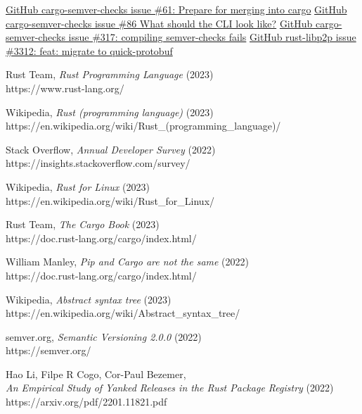 \documentclass[licencjacka,en]{pracamgr}
\begin{document}
\begin{thebibliography}{99}\label{r:chapter_bibliography}

 \href{}{GitHub cargo-semver-checks issue \#61: Prepare for merging into cargo}
 \href{}{GitHub cargo-semver-checks issue \#86 What should the CLI look like?}
 \href{}{GitHub cargo-semver-checks issue \#317: compiling semver-checks fails}
 \href{}{GitHub rust-libp2p issue \#3312: feat: migrate to quick-protobuf}

 Rust Team,
	\textit{Rust Programming Language} (2023) \\
	https://www.rust-lang.org/

 Wikipedia,
	\textit{Rust (programming language)} (2023) \\
	https://en.wikipedia.org/wiki/Rust\_(programming\_language)/

 Stack Overflow,
	\textit{Annual Developer Survey} (2022) \\
	https://insights.stackoverflow.com/survey/

 Wikipedia,
	\textit{Rust for Linux} (2023) \\
	https://en.wikipedia.org/wiki/Rust\_for\_Linux/

 Rust Team,
	\textit{The Cargo Book} (2023) \\
	https://doc.rust-lang.org/cargo/index.html/

 William Manley,
	\textit{Pip and Cargo are not the same} (2022) \\
	https://doc.rust-lang.org/cargo/index.html/

 Wikipedia,
	\textit{Abstract syntax tree} (2023) \\
	https://en.wikipedia.org/wiki/Abstract\_syntax\_tree/

 semver.org,
	\textit{Semantic Versioning 2.0.0} (2022) \\
	https://semver.org/

 Hao Li, Filpe R Cogo, Cor-Paul Bezemer, \\
    \textit{An Empirical Study of Yanked Releases in the Rust Package Registry}
    (2022) \\ https://arxiv.org/pdf/2201.11821.pdf


\end{thebibliography}
\end{document}

